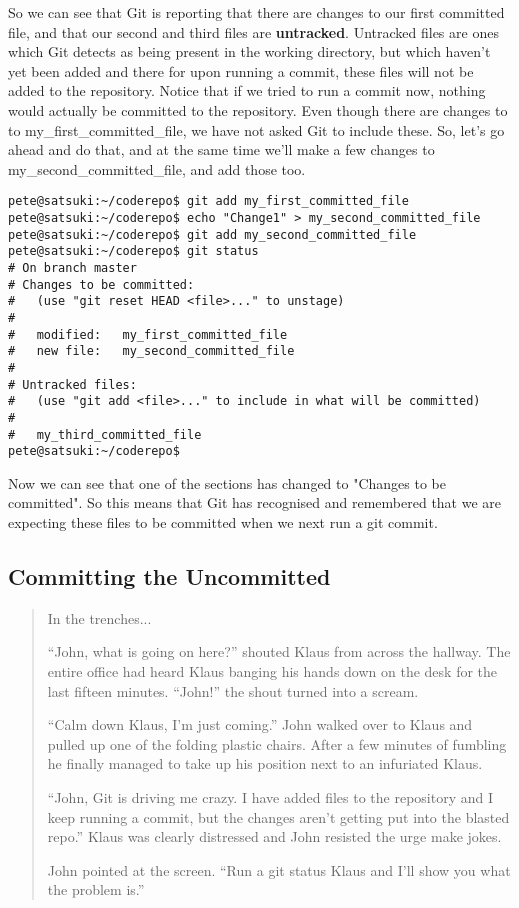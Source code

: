 So we can see that Git is reporting that there are changes to our first committed file, and that our second and third files are \textbf{untracked}.  Untracked files are ones which Git detects as being present in the working directory, but which haven't yet been added and there for upon running a commit, these files will not be added to the repository.  Notice that if we tried to run a commit now, nothing would actually be committed to the repository.  Even though there are changes to to my\_first\_committed\_file, we have not asked Git to include these.  So, let's go ahead and do that, and at the same time we'll make a few changes to my\_second\_committed\_file, and add those too.

\begin{verbatim} 
pete@satsuki:~/coderepo$ git add my_first_committed_file
pete@satsuki:~/coderepo$ echo "Change1" > my_second_committed_file 
pete@satsuki:~/coderepo$ git add my_second_committed_file
pete@satsuki:~/coderepo$ git status
# On branch master
# Changes to be committed:
#   (use "git reset HEAD <file>..." to unstage)
#
#	modified:   my_first_committed_file
#	new file:   my_second_committed_file
#
# Untracked files:
#   (use "git add <file>..." to include in what will be committed)
#
#	my_third_committed_file
pete@satsuki:~/coderepo$ 
\end{verbatim} 

Now we can see that one of the sections has changed to "Changes to be committed".  So this means that Git has recognised and remembered that we are expecting these files to be committed when we next run a git commit.  

\subsection*{Committing the Uncommitted}

\begin{quote}In the trenches...

``John, what is going on here?'' shouted Klaus from across the hallway.  The entire office had heard Klaus banging his hands down on the desk for the last fifteen minutes.  ``John!'' the shout turned into a scream.

``Calm down Klaus, I'm just coming.''  John walked over to Klaus and pulled up one of the folding plastic chairs.  After a few minutes of fumbling he finally managed to take up his position next to an infuriated Klaus.

``John, Git is driving me crazy.  I have added files to the repository and I keep running a commit, but the changes aren't getting put into the blasted repo.''  Klaus was clearly distressed and John resisted the urge make jokes.

John pointed at the screen.  ``Run a git status Klaus and I'll show you what the problem is.''
\end{quote}

